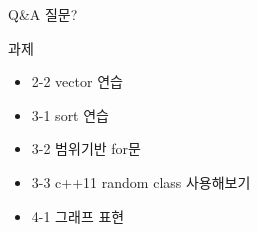 \documentclass[10pt]{beamer}
\begin{document}
\begin{frame}{Q\&A}
    질문?
\end{frame}


\begin{frame}{과제}
    \begin{itemize}
        \item 2-2 vector 연습
        \item 3-1 sort 연습 
        \item 3-2 범위기반 for문
        \item 3-3 c++11 random class 사용해보기
        \item 4-1 그래프 표현
    \end{itemize}
\end{frame}    
\end{document}

